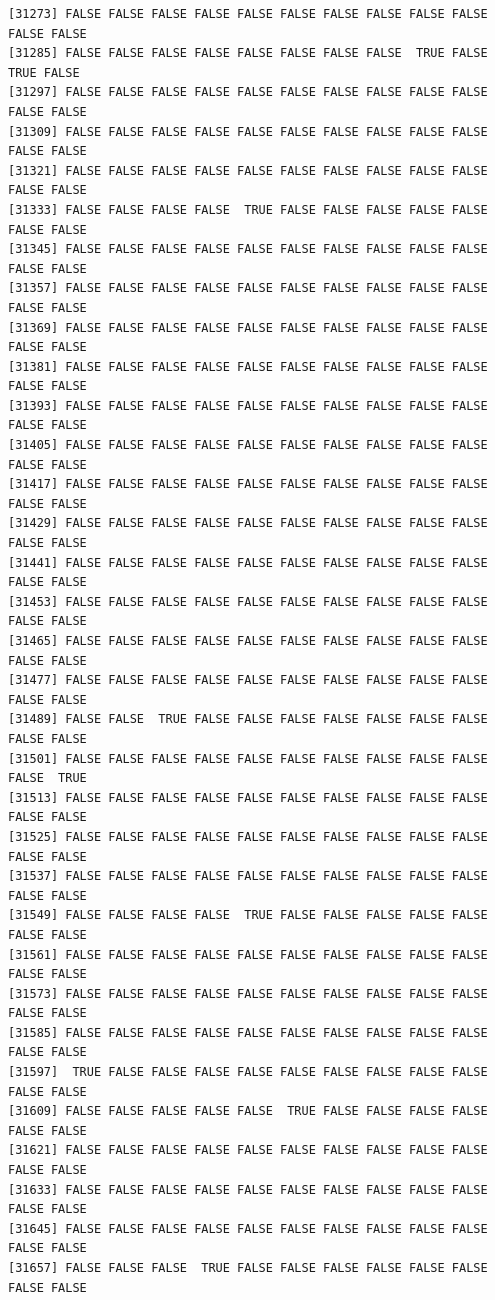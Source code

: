 \documentclass[
  a4paper,
  DIV=11,
  numbers=noendperiod]{scrartcl}
\begin{document}
\begin{verbatim}
[31273] FALSE FALSE FALSE FALSE FALSE FALSE FALSE FALSE FALSE FALSE FALSE FALSE
[31285] FALSE FALSE FALSE FALSE FALSE FALSE FALSE FALSE  TRUE FALSE  TRUE FALSE
[31297] FALSE FALSE FALSE FALSE FALSE FALSE FALSE FALSE FALSE FALSE FALSE FALSE
[31309] FALSE FALSE FALSE FALSE FALSE FALSE FALSE FALSE FALSE FALSE FALSE FALSE
[31321] FALSE FALSE FALSE FALSE FALSE FALSE FALSE FALSE FALSE FALSE FALSE FALSE
[31333] FALSE FALSE FALSE FALSE  TRUE FALSE FALSE FALSE FALSE FALSE FALSE FALSE
[31345] FALSE FALSE FALSE FALSE FALSE FALSE FALSE FALSE FALSE FALSE FALSE FALSE
[31357] FALSE FALSE FALSE FALSE FALSE FALSE FALSE FALSE FALSE FALSE FALSE FALSE
[31369] FALSE FALSE FALSE FALSE FALSE FALSE FALSE FALSE FALSE FALSE FALSE FALSE
[31381] FALSE FALSE FALSE FALSE FALSE FALSE FALSE FALSE FALSE FALSE FALSE FALSE
[31393] FALSE FALSE FALSE FALSE FALSE FALSE FALSE FALSE FALSE FALSE FALSE FALSE
[31405] FALSE FALSE FALSE FALSE FALSE FALSE FALSE FALSE FALSE FALSE FALSE FALSE
[31417] FALSE FALSE FALSE FALSE FALSE FALSE FALSE FALSE FALSE FALSE FALSE FALSE
[31429] FALSE FALSE FALSE FALSE FALSE FALSE FALSE FALSE FALSE FALSE FALSE FALSE
[31441] FALSE FALSE FALSE FALSE FALSE FALSE FALSE FALSE FALSE FALSE FALSE FALSE
[31453] FALSE FALSE FALSE FALSE FALSE FALSE FALSE FALSE FALSE FALSE FALSE FALSE
[31465] FALSE FALSE FALSE FALSE FALSE FALSE FALSE FALSE FALSE FALSE FALSE FALSE
[31477] FALSE FALSE FALSE FALSE FALSE FALSE FALSE FALSE FALSE FALSE FALSE FALSE
[31489] FALSE FALSE  TRUE FALSE FALSE FALSE FALSE FALSE FALSE FALSE FALSE FALSE
[31501] FALSE FALSE FALSE FALSE FALSE FALSE FALSE FALSE FALSE FALSE FALSE  TRUE
[31513] FALSE FALSE FALSE FALSE FALSE FALSE FALSE FALSE FALSE FALSE FALSE FALSE
[31525] FALSE FALSE FALSE FALSE FALSE FALSE FALSE FALSE FALSE FALSE FALSE FALSE
[31537] FALSE FALSE FALSE FALSE FALSE FALSE FALSE FALSE FALSE FALSE FALSE FALSE
[31549] FALSE FALSE FALSE FALSE  TRUE FALSE FALSE FALSE FALSE FALSE FALSE FALSE
[31561] FALSE FALSE FALSE FALSE FALSE FALSE FALSE FALSE FALSE FALSE FALSE FALSE
[31573] FALSE FALSE FALSE FALSE FALSE FALSE FALSE FALSE FALSE FALSE FALSE FALSE
[31585] FALSE FALSE FALSE FALSE FALSE FALSE FALSE FALSE FALSE FALSE FALSE FALSE
[31597]  TRUE FALSE FALSE FALSE FALSE FALSE FALSE FALSE FALSE FALSE FALSE FALSE
[31609] FALSE FALSE FALSE FALSE FALSE  TRUE FALSE FALSE FALSE FALSE FALSE FALSE
[31621] FALSE FALSE FALSE FALSE FALSE FALSE FALSE FALSE FALSE FALSE FALSE FALSE
[31633] FALSE FALSE FALSE FALSE FALSE FALSE FALSE FALSE FALSE FALSE FALSE FALSE
[31645] FALSE FALSE FALSE FALSE FALSE FALSE FALSE FALSE FALSE FALSE FALSE FALSE
[31657] FALSE FALSE FALSE  TRUE FALSE FALSE FALSE FALSE FALSE FALSE FALSE FALSE

\end{verbatim}
\end{document}
